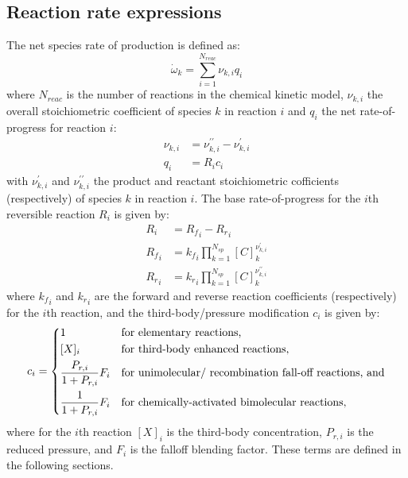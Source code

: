 \documentclass[12pt]{article}
\newcommand{\ns}{N_{sp}}
\newcommand{\nr}{N_{reac}}
\begin{document}
\subsection{Reaction rate expressions}
The net species rate of production is defined as:
\begin{equation}
 \label{e:spec_rop}
 \dot{\omega}_{k} = \sum_{i=1}^{\nr} \nu_{k,i} q_{i}
\end{equation}
where $\nr$ is the number of reactions in the chemical kinetic model, $\nu_{k, i}$ the overall stoichiometric coefficient of species $k$ in reaction $i$ and $q_i$ the net rate-of-progress for reaction $i$:
\begin{align}
\nu_{k,i} &= \nu^{\prime\prime}_{k,i} - \nu^{\prime}_{k,i} \\
q_{i} &= R_{i} c_{i}
\end{align}
with $\nu^{\prime}_{k,i}$ and $\nu^{\prime\prime}_{k,i}$ the product and reactant stoichiometric cofficients (respectively) of species $k$ in reaction $i$.
The base rate-of-progress for the $i$th reversible reaction $R_{i}$ is given by:
\begin{align}
R_{i} &= {R_f}_{i} - {R_r}_{i} \label{e:ropnet}\\
{R_f}_{i} &= {k_f}_{i} \prod_{k=1}^{\ns} [C]_{k}^{\nu^{\prime}_{k,i}} \label{e:ropf}\\
{R_r}_{i} &= {k_r}_{i} \prod_{k=1}^{\ns} [C]_{k}^{\nu^{\prime\prime}_{k,i}} \label{e:ropr}
\end{align}
where ${k_f}_{i}$ and ${k_r}_{i}$ are the forward and reverse reaction coefficients (respectively) for the $i$th reaction, and the third-body\slash pressure modification $c_{i}$ is given by:
\begin{equation}
\label{e:rxn_pressure}
c_i = \begin{dcases}
  1 &\text{for elementary reactions,} \\
  [X]_i &\text{for third-body enhanced reactions,} \\
  \frac{P_{r,i}}{1 + P_{r,i}} F_i &\text{for unimolecular\slash~recombination fall-off reactions, and} \\
  \frac{1}{1 + P_{r,i}} F_i &\text{for chemically-activated bimolecular reactions,}
  \end{dcases}
\end{equation}
where for the $i$th reaction $[X]_i$ is the third-body concentration, $P_{r,i}$ is the reduced pressure, and $F_i$ is the falloff blending factor.
These terms are defined in the following sections.
\end{document}
